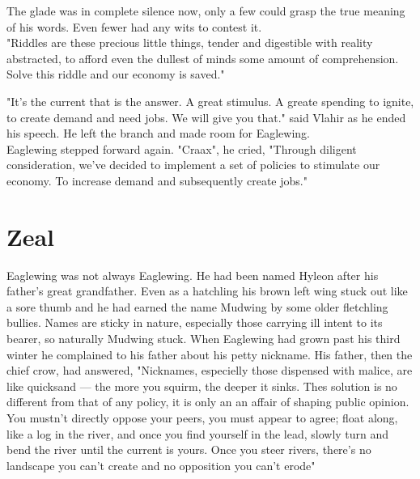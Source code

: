\documentclass[smalldemyvopaper,11pt,twoside,onecolumn,openright,extrafontsizes]{memoir}
\begin{document}
The glade was in complete silence now, only a few could grasp the true meaning of his words. Even fewer had any wits to contest it. \\

"Riddles are these precious little things, tender and digestible with reality abstracted, to afford even the dullest of minds some amount of comprehension. Solve this riddle and our economy is saved."

"It's the current that is the answer. A great stimulus. A greate spending to ignite, to create demand and need jobs. We will give you that." said Vlahir as he ended his speech. He left the branch and made room for Eaglewing.\\

Eaglewing stepped forward again. "Craax", he cried, "Through diligent consideration, we've decided to implement a set of policies to stimulate our economy. To increase demand and subsequently create jobs."







\chapter{Zeal}

	
Eaglewing was not always Eaglewing. He had been named Hyleon after his father's great grandfather. Even as a hatchling his brown left wing stuck out like a sore thumb and he had earned the name Mudwing by some older fletchling bullies. Names are sticky in nature, especially those carrying ill intent to its bearer, so naturally Mudwing stuck. When Eaglewing had grown past his third winter he complained to his father about his petty nickname. His father, then the chief crow, had answered, "Nicknames, especielly those dispensed with malice, are like quicksand — the more you squirm, the deeper it sinks. Thes solution is no different from that of any policy, it is only an an affair of shaping public opinion. You mustn't directly oppose your peers, you must appear to agree; float along, like a log in the river, and once you find yourself in the lead, slowly turn and bend the river until the current is yours. Once you steer rivers, there's no landscape you can't create and no opposition you can't erode"
\end{document}
